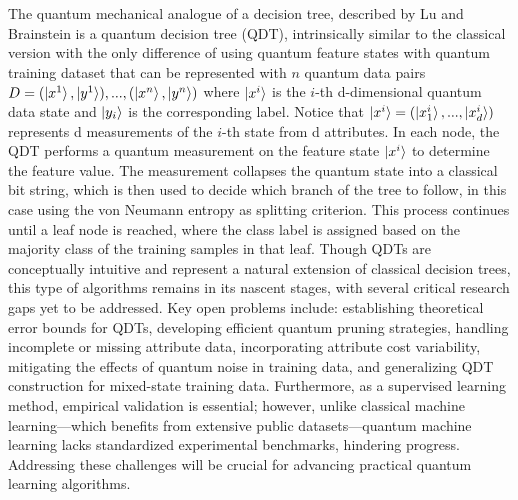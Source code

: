 \documentclass{article}
\begin{document}
The quantum mechanical analogue of a decision tree, described by Lu and Brainstein \cite{} is a quantum decision tree (QDT), intrinsically similar to the classical version with the only difference of using quantum feature states with quantum training dataset that can be represented with $n$ quantum data pairs $D = {(\ket{x^1},\ket{y^1}), ..., (\ket{x^n},\ket{y^n})}$ where $\ket{x^i}$ is the $i$-th d-dimensional quantum data state and $\ket{y_i}$ is the corresponding label.
Notice that $\ket{x^i}=(\ket{x^i_1}, ..., \ket{x^i_d})$ represents d measurements of the $i$-th state from d attributes. In each node, the QDT performs a quantum measurement on the feature state $\ket{x^i}$ to determine the feature value. The measurement collapses the quantum state into a classical bit string, which is then used to decide which branch of the tree to follow, in this case using the von Neumann entropy as splitting criterion. This process continues until a leaf node is reached, where the class label is assigned based on the majority class of the training samples in that leaf.
Though QDTs are conceptually intuitive and represent a natural extension of classical decision trees, this type of algorithms remains in its nascent stages, with several critical research gaps yet to be addressed. Key open problems include: establishing theoretical error bounds for QDTs, developing efficient quantum pruning strategies, handling incomplete or missing attribute data, incorporating attribute cost variability, mitigating the effects of quantum noise in training data, and generalizing QDT construction for mixed-state training data. Furthermore, as a supervised learning method, empirical validation is essential; however, unlike classical machine learning—which benefits from extensive public datasets—quantum machine learning lacks standardized experimental benchmarks, hindering progress. Addressing these challenges will be crucial for advancing practical quantum learning algorithms.


\end{document}
